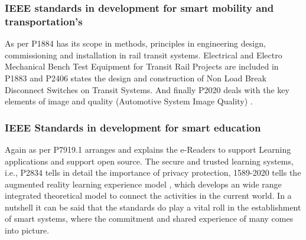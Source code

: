 \documentclass[sigconf]{acmart}
\begin{document}
\subsubsection{\textbf{IEEE standards in development for smart mobility and transportation's}}
As per \citep{lai2020review} P1884 has its scope in methods, principles in engineering design, commissioning and installation in rail transit systems. Electrical and Electro Mechanical Bench Test Equipment for Transit Rail Projects are included in P1883 and P2406 states the design and construction of Non Load Break Disconnect Switches on Transit Systems. And finally P2020 deals with the key elements of image and quality (Automotive System Image Quality) \cite{IEEE}.

\subsubsection{\textbf{IEEE Standards in development for smart education}}
Again as per \citep{P7919.1} P7919.1 arranges and explains the e-Readers to support Learning applications and support open source. The secure and trusted learning systems, i.e., P2834 \cite{P2834} tells in detail the importance of privacy protection, 1589-2020 tells the augmented reality learning experience model \cite{lai2020review}, which develops an wide range integrated theoretical model to connect the activities in the current world. In a nutshell it can be said that the standards do play a vital roll in the establishment of smart systems, where the commitment and shared experience of many comes into picture. 
\end{document}
